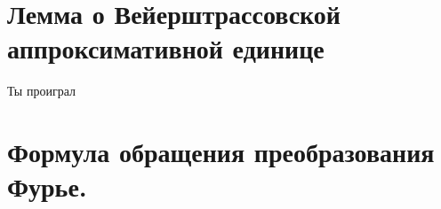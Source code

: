 \documentclass[paper=a4, fontsize=14pt]{report}
\begin{document}
	


\section{Лемма о Вейерштрассовской аппроксимативной единице}

Ты проиграл


\section{Формула обращения преобразования Фурье.}
\end{document}
